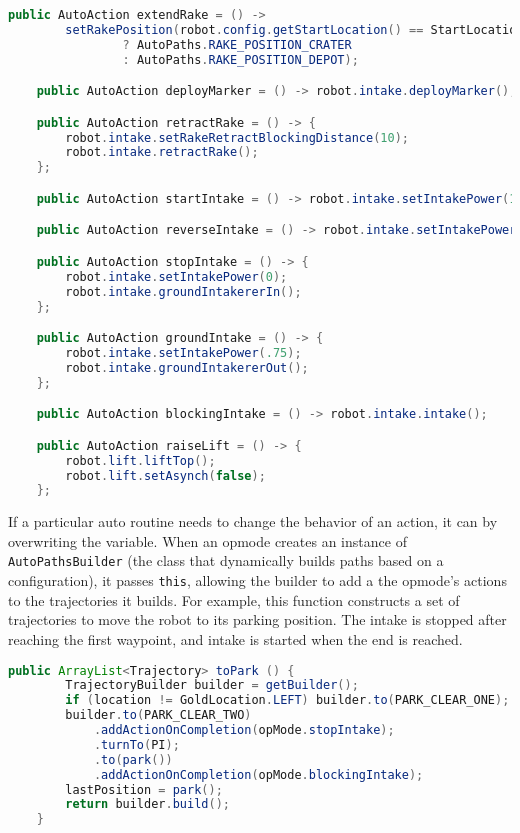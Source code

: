 \documentclass{article}
\begin{document}
\begin{lstlisting}[language=Java] 
    public AutoAction extendRake = () ->
        setRakePosition(robot.config.getStartLocation() == StartLocation.CRATER
                ? AutoPaths.RAKE_POSITION_CRATER
                : AutoPaths.RAKE_POSITION_DEPOT);

    public AutoAction deployMarker = () -> robot.intake.deployMarker();

    public AutoAction retractRake = () -> {
        robot.intake.setRakeRetractBlockingDistance(10);
        robot.intake.retractRake();
    };

    public AutoAction startIntake = () -> robot.intake.setIntakePower(1);

    public AutoAction reverseIntake = () -> robot.intake.setIntakePower(-1);

    public AutoAction stopIntake = () -> {
        robot.intake.setIntakePower(0);
        robot.intake.groundIntakererIn();
    };

    public AutoAction groundIntake = () -> {
        robot.intake.setIntakePower(.75);
        robot.intake.groundIntakererOut();
    };

    public AutoAction blockingIntake = () -> robot.intake.intake();

    public AutoAction raiseLift = () -> {
        robot.lift.liftTop();
        robot.lift.setAsynch(false);
    };

\end{lstlisting}

If a particular auto routine needs to change the behavior of an action, it can by overwriting the variable. When an opmode creates an instance of \texttt{AutoPathsBuilder} (the class that dynamically builds paths based on a configuration), it passes \texttt{this}, allowing the builder to add a the opmode's actions to the trajectories it builds. For example, this function constructs a set of trajectories to move the robot to its parking position. The intake is stopped after reaching the first waypoint, and intake is started when the end is reached. 

\begin{lstlisting}[language=Java] 
     public ArrayList<Trajectory> toPark () {
        TrajectoryBuilder builder = getBuilder();
        if (location != GoldLocation.LEFT) builder.to(PARK_CLEAR_ONE);
        builder.to(PARK_CLEAR_TWO)
            .addActionOnCompletion(opMode.stopIntake);
            .turnTo(PI);
            .to(park())
            .addActionOnCompletion(opMode.blockingIntake);
        lastPosition = park();
        return builder.build();
    }

\end{lstlisting}
\end{document}
